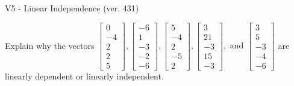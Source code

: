 \begin{exercise}
  \begin{exerciseTitle}V5 - Linear Independence (ver. 431)\end{exerciseTitle}
  \begin{exerciseStatement}
    Explain why the vectors \(\left[\begin{array}{r}
0 \\
-4 \\
2 \\
2 \\
5
\end{array}\right] , \left[\begin{array}{r}
-6 \\
1 \\
-3 \\
-2 \\
-6
\end{array}\right] , \left[\begin{array}{r}
5 \\
-4 \\
2 \\
-5 \\
2
\end{array}\right] , \left[\begin{array}{r}
3 \\
21 \\
-3 \\
15 \\
-3
\end{array}\right] , \text{ and } \left[\begin{array}{r}
3 \\
5 \\
-3 \\
-4 \\
-6
\end{array}\right]\) are linearly dependent or linearly independent.	



\end{exerciseStatement}
\end{exercise}
